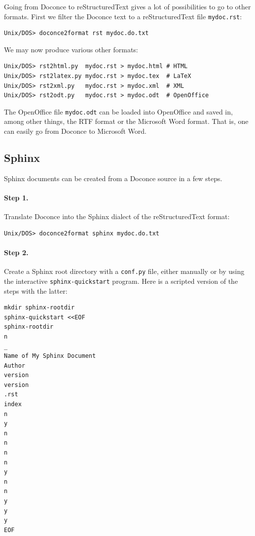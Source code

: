\documentclass{article}
\begin{document}
Going from Doconce to reStructuredText gives a lot of possibilities to
go to other formats. First we filter the Doconce text to a
reStructuredText file {\fontsize{10pt}{10pt}\verb!mydoc.rst!}:
\begin{Verbatim}[fontsize=\fontsize{9pt}{9pt},tabsize=8,baselinestretch=0.85,
fontfamily=tt,xleftmargin=7mm]
Unix/DOS> doconce2format rst mydoc.do.txt
\end{Verbatim}
\noindent
We may now produce various other formats:
\begin{Verbatim}[fontsize=\fontsize{9pt}{9pt},tabsize=8,baselinestretch=0.85,
fontfamily=tt,xleftmargin=7mm]
Unix/DOS> rst2html.py  mydoc.rst > mydoc.html # HTML
Unix/DOS> rst2latex.py mydoc.rst > mydoc.tex  # LaTeX
Unix/DOS> rst2xml.py   mydoc.rst > mydoc.xml  # XML
Unix/DOS> rst2odt.py   mydoc.rst > mydoc.odt  # OpenOffice
\end{Verbatim}
\noindent
The OpenOffice file {\fontsize{10pt}{10pt}\verb!mydoc.odt!} can be loaded into OpenOffice and
saved in, among other things, the RTF format or the Microsoft Word format.
That is, one can easily go from Doconce to Microsoft Word.

\subsection{Sphinx}

Sphinx documents can be created from a Doconce source in a few steps.

\paragraph{Step 1.}
Translate Doconce into the Sphinx dialect of
the reStructuredText format:
\begin{Verbatim}[fontsize=\fontsize{9pt}{9pt},tabsize=8,baselinestretch=0.85,
fontfamily=tt,xleftmargin=7mm]
Unix/DOS> doconce2format sphinx mydoc.do.txt
\end{Verbatim}
\noindent

\paragraph{Step 2.}
Create a Sphinx root directory with a {\fontsize{10pt}{10pt}\verb!conf.py!} file, 
either manually or by using the interactive {\fontsize{10pt}{10pt}\verb!sphinx-quickstart!}
program. Here is a scripted version of the steps with the latter:
\begin{Verbatim}[fontsize=\fontsize{9pt}{9pt},tabsize=8,baselinestretch=0.85,
fontfamily=tt,xleftmargin=7mm]
mkdir sphinx-rootdir
sphinx-quickstart <<EOF
sphinx-rootdir
n
_
Name of My Sphinx Document
Author
version
version
.rst
index
n
y
n
n
n
n
y
n
n
y
y
y
EOF
\end{Verbatim}
\noindent
\end{document}

